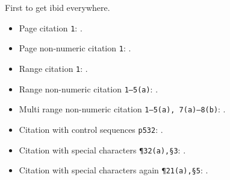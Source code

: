 \documentclass[english]{article}
\def\mymacro{p532}
\begin{document}
First \cite{opiniontwombly} to get ibid everywhere.

\begin{itemize}
\item Page citation \texttt{1}: \cite[5]{opiniontwombly}.
\item Page non-numeric citation \texttt{1}: \cite[5(a)]{opiniontwombly}.
\item Range citation \texttt{1}: \cite[1--5]{opiniontwombly}.
\item Range non-numeric citation \texttt{1--5(a)}: \cite[1--5(a)]{opiniontwombly}.
\item Multi range non-numeric citation \texttt{1--5(a), 7(a)--8(b)}: \cite[1--5(a), 7(a)--8(b)]{opiniontwombly}.
\item Citation with control sequences \texttt{\string\mymacro}: \cite[\mymacro]{opiniontwombly}.
\item Citation with special characters \texttt{\string\P 32(a),\string\S 3}: \cite[\P 32a,\S 3]{opiniontwombly}.
\item Citation with special characters again \texttt{\string\P 21(a),\string\S 5}: \cite[\P 21a,\S 5]{opiniontwombly}.
\end{itemize}

\printbibliography[title={Table of Cases}]
\end{document}
